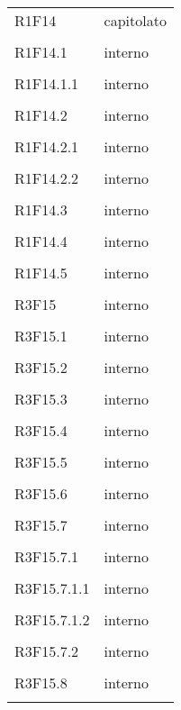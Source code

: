 \documentclass[a4paper]{article}
\begin{document}
\begin{longtable}{ >{\centering}p{}
		>{\centering}p{}}
	R1F14 & capitolato\\\tabularnewline
	
	R1F14.1 & interno\\\tabularnewline
	
	R1F14.1.1 & interno\\\tabularnewline
	
	R1F14.2 & interno\\\tabularnewline
	
	R1F14.2.1 & interno\\\tabularnewline
	
	R1F14.2.2 & interno\\\tabularnewline
	
	R1F14.3 & interno\\\tabularnewline
	
	R1F14.4 & interno\\\tabularnewline
	
	R1F14.5 & interno\\\tabularnewline
	
	R3F15 & interno\\\tabularnewline
	
	R3F15.1 & interno\\\tabularnewline
	
	R3F15.2 & interno\\\tabularnewline
	
	R3F15.3 & interno\\\tabularnewline
	
	R3F15.4 & interno\\\tabularnewline
	
	R3F15.5 & interno\\\tabularnewline
	
	R3F15.6 & interno\\\tabularnewline
	
	R3F15.7 & interno\\\tabularnewline
	
	R3F15.7.1 & interno\\\tabularnewline
	
	R3F15.7.1.1 & interno\\\tabularnewline
	
	R3F15.7.1.2 & interno\\\tabularnewline
	
	R3F15.7.2 & interno\\\tabularnewline
	
	R3F15.8 & interno\\\tabularnewline
	

\end{longtable}
\end{document}

